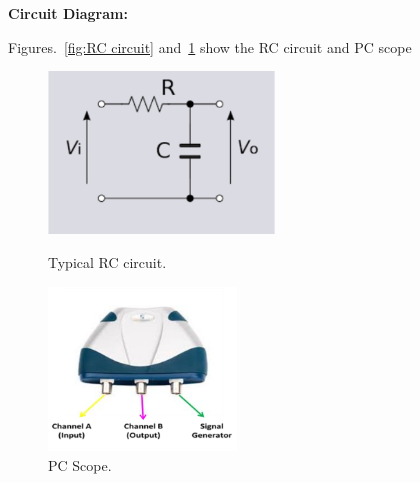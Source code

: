 \documentclass[9pt]{scrreprt}
\begin{document}
\textbf{Circuit Diagram:}\\
\par Figures.~\ref{fig:RC circuit} and~\ref{fig:PC scope} show the RC circuit and PC scope
\begin{figure}[H]
\centering
\begin{minipage}{.5\textwidth}
  \centering
  \includegraphics[width=6cm]{logos/RC_circuit.png}
  \caption{Typical RC circuit.}
  \label{fig:RC circuit}
\end{minipage}%
\begin{minipage}{.5\textwidth}
  \centering
  \includegraphics[width=5cm]{logos/PC_scope.png}
  \caption{PC Scope.}
  \label{fig:PC scope}
\end{minipage}
\end{figure}
\end{document}
